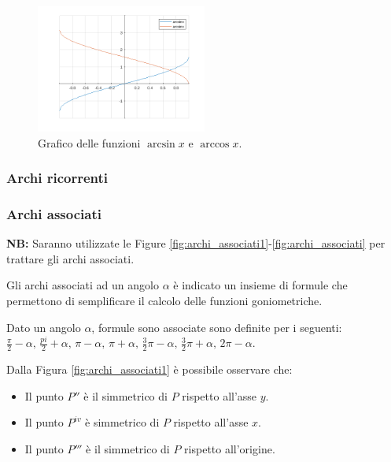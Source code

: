 \begin{figure}
    \centering
    \includegraphics[width=0.5\textwidth]{Analisi1/figures/arcsincosx.png}
    \caption{Grafico delle funzioni $\arcsin x$ e $\arccos x$.}
    \label{fig:arcsincosx}
\end{figure}

\subsubsection{Archi ricorrenti}

\subsubsection{Archi associati}

\textbf{NB:} Saranno utilizzate le Figure \ref{fig:archi_associati1}-\ref{fig:archi_associati} per trattare gli archi associati.

Gli archi associati ad un angolo $\alpha$ è indicato un insieme di formule che permettono di semplificare il calcolo delle funzioni goniometriche.

\begin{definition}
    Dato un angolo $\alpha$, formule sono associate sono definite per i seguenti: $\frac{\pi}{2}-\alpha,\, \frac{pi}{2}+\alpha,\, \pi - \alpha,\, \pi+\alpha,\, \frac{3}{2}\pi-\alpha,\, \frac{3}{2}\pi+\alpha,\, 2\pi - \alpha$.
\end{definition}

Dalla Figura \ref{fig:archi_associati1} è possibile osservare che:
\begin{itemize}
    \item Il punto $P''$ è il simmetrico di $P$ rispetto all'asse $y$.
    \item Il punto $P^{iv}$ è simmetrico di $P$ rispetto all'asse $x$.
    \item Il punto $P'''$ è il simmetrico di $P$ rispetto all'origine.
\end{itemize}

